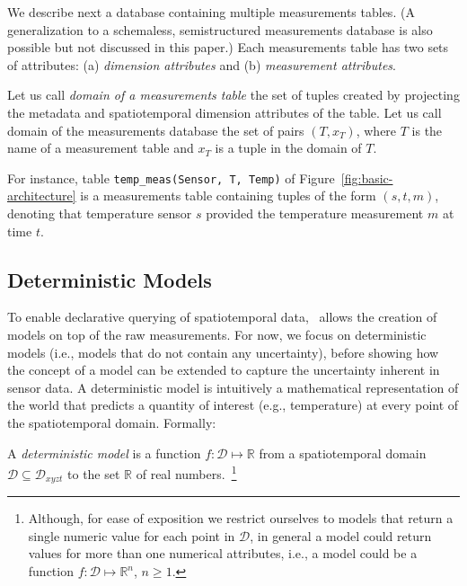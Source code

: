 We describe next a database containing multiple measurements tables. (A generalization to a schemaless, semistructured measurements database is also possible but not discussed in this paper.) Each measurements table has two sets of attributes: (a) {\em dimension attributes} and (b) {\em measurement attributes}. 

Let us call {\em domain of a measurements table} the set of tuples created by projecting  the metadata and spatiotemporal dimension attributes of the table. Let us call domain of the measurements database the set of pairs $(T, x_T)$, where $T$ is the name of a measurement table and $x_T$ is a tuple in the domain of $T$.


\begin{example}
For instance, table \texttt{temp\_meas(Sensor, T, Temp)} of Figure~\ref{fig:basic-architecture} is a measurements table containing tuples of the form $(s, t, m)$, denoting that temperature sensor $s$ provided the temperature measurement $m$ at time $t$.
\end{example}

\subsection{Deterministic Models}
\label{sec:deterministic-models}

To enable declarative querying of spatiotemporal data, \projName\ allows the creation of models on top of the raw measurements. For now, we focus on deterministic models (i.e., models that do not contain any uncertainty), before showing how the concept of a model can be extended to capture the uncertainty inherent in sensor data. A deterministic model is intuitively a mathematical representation of the world that predicts a quantity of interest (e.g., temperature) at every point of the spatiotemporal domain. Formally:

\begin{defin}
A {\em deterministic model} is a function $f:\mathcal{D}\mapsto \mathbb{R}$ from a spatiotemporal domain $\mathcal{D} \subseteq \mathcal{D}_{xyzt}$ to the set $\mathbb{R}$ of real numbers.~\footnote{Although, for ease of exposition we restrict ourselves to models that return a single numeric value for each point in $\mathcal{D}$, in general a model could return values for more than one numerical attributes, i.e., a model could be a function  $f:\mathcal{D}\mapsto \mathbb{R}^n$, $n \ge 1$.}
\end{defin}

